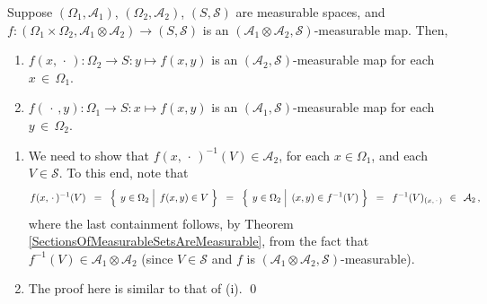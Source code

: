 \begin{theorem}
\mbox{}\vskip0.1cm\noindent
Suppose
$\left(\Omega_{1},\mathcal{A}_{1}\right)$, $\left(\Omega_{2},\mathcal{A}_{2}\right)$, $\left(S,\mathcal{S}\right)$
are measurable spaces, and
$f : \left(\Omega_{1}\times\Omega_{2},\mathcal{A}_{1}\otimes\mathcal{A}_{2}\right) \longrightarrow \left(S,\mathcal{S}\right)$
is an $\left(\mathcal{A}_{1}\otimes\mathcal{A}_{2},\mathcal{S}\right)$-measurable map.
Then,
\begin{enumerate}
\item	$f{(x,\,\cdot\,)} : \Omega_{2} \longrightarrow S : y \longmapsto f(x,y)$
		is an $\left(\mathcal{A}_{2},\mathcal{S}\right)$-measurable map
		for each\, $x\,\in\,\Omega_{1}$.
\item	$f{(\,\cdot\,,y)} : \Omega_{1} \longrightarrow S : x \longmapsto f(x,y)$
		is an $\left(\mathcal{A}_{1},\mathcal{S}\right)$-measurable map
		for each\, $y\,\in\,\Omega_{2}$.
\end{enumerate}
\end{theorem}
\proof
\begin{enumerate}
\item
	We need to show that $f(x,\,\cdot\,)^{-1}\!\left(V\right) \in \mathcal{A}_{2}$,
	for each $x \in \Omega_{1}$, and each $V \in \mathcal{S}$.
	To this end, note that
	\begin{equation*}
	f(x,\,\cdot\,)^{-1}\!\left(V\right)
	\;\; = \;\;
		\left\{\;
		\left. y \overset{{\color{white}.}}{\in} \Omega_{2} \;\right\vert\; f(x,y) \in V
		\;\right\}
	\;\; = \;\;
		\left\{\;
		\left. y \overset{{\color{white}.}}{\in} \Omega_{2} \;\right\vert\; (x,y) \in f^{-1}(V)
		\;\right\}
	\;\; = \;\; f^{-1}(V)_{(x,\,\cdot\,)} \;\, \in \;\, \mathcal{A}_{2}\,,
	\end{equation*}
	where the last containment follows, by Theorem \ref{SectionsOfMeasurableSetsAreMeasurable},
	from the fact that $f^{-1}(V) \in \mathcal{A}_{1}\otimes\mathcal{A}_{2}$
	(since $V \in \mathcal{S}$ and $f$ is $(\mathcal{A}_{1}\otimes\mathcal{A}_{2},\mathcal{S})$-measurable).
\item
	The proof here is similar to that of (i).
	\qed
\end{enumerate}

